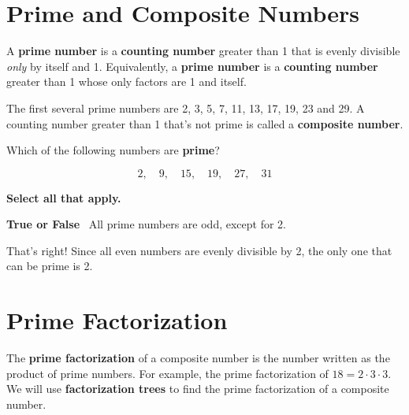 \documentclass{ximera}[font=12pt]  %
\begin{document}
\section*{Prime and Composite Numbers}

\begin{definition}
A \textbf{prime number} is a \textbf{counting number} greater than 1 that is evenly
divisible \emph{only} by itself and 1.  Equivalently, a \textbf{prime number} is a \textbf{counting number} greater
than 1 whose only factors are 1 and itself.
\end{definition}

The first several prime numbers are 2, 3, 5, 7, 11, 13, 17, 19, 23 and 29.  A counting number greater than 1 that's not prime 
is called a \textbf{composite number}.

\begin{problem}
Which of the following numbers are \textbf{prime}?

  \[ 2, \quad 9, \quad 15, \quad 19, \quad 27, \quad 31 \]

  \textbf{Select all that apply.}
  \begin{selectAll}
  \end{selectAll}

\end{problem}


\begin{problem}  \textcolor{orange!80!black}{\textbf{True or False}} \  All prime numbers are odd, except for 2.

\begin{multipleChoice}
\end{multipleChoice}

\begin{feedback}[correct]
That's right!  Since all even numbers are evenly divisible by 2, the only one that can be prime is 2.
\end{feedback}

\end{problem}

\section*{Prime Factorization}

The \textbf{prime factorization} of a composite number is the number written as the
product of prime numbers.  For example, the prime factorization of $18 =  2 \cdot 3 \cdot 3.$
We will use \textbf{factorization trees} to find the prime factorization of a composite number.
\end{document}
